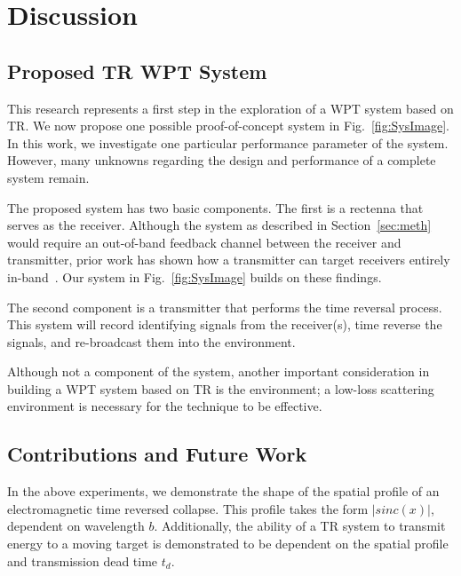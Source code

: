 \section{Discussion}
\label{sec:discussion}

\subsection{Proposed TR WPT System}
\label{sec:system}

This research represents a first step in the exploration of a WPT system based on TR. We now propose one possible proof-of-concept system in Fig.~\ref{fig:SysImage}. In this work, we investigate one particular performance parameter of the system. However, many unknowns regarding the design and performance of a complete system remain.

The proposed system has two basic components. The first is a rectenna that serves as the receiver. Although the system as described in Section~\ref{sec:meth} would require an out-of-band feedback channel between the receiver and transmitter, prior work has shown how a transmitter can target  receivers entirely in-band~\cite{nltr-wave-chaotic,roman}. Our system in Fig.~\ref{fig:SysImage} builds on these findings.

The second component is a transmitter that performs the time reversal process. This system will record identifying signals from the receiver(s), time reverse the signals, and re-broadcast them into the environment.

Although not a component of the system, another important consideration in building a WPT system based on TR is the environment; a low-loss scattering environment is necessary for the technique to be effective.

\subsection{Contributions and Future Work}
\label{sec:contrib}

In the above experiments, we demonstrate the shape of the spatial profile of an electromagnetic
time reversed collapse. This profile takes the form $\left|sinc(x)\right|$, dependent on wavelength $b$.
Additionally, the ability of a TR system to transmit energy to a moving target is
demonstrated to be dependent on the spatial profile and transmission dead
time $t_{d}$.

